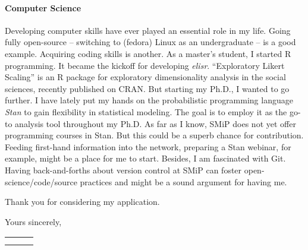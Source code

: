 \documentclass[11pt]{FreemanML}
\begin{document}
\paragraph{Computer Science}

Developing computer skills have ever played an essential role in my life. Going
fully open-source -- switching to (fedora) Linux as an undergraduate -- is a
good example. Acquiring coding skills is another. As a master's student, I
started R programming. It became the kickoff for developing \textit{elisr}.
\enquote{Exploratory Likert Scaling} is an R package for exploratory
dimensionality analysis in the social sciences, recently published on CRAN. But
starting my Ph.D., I wanted to go further. I have lately put my hands on the
probabilistic programming language \textit{Stan} to gain flexibility in
statistical modeling. The goal is to employ it as the go-to analysis tool
throughout my Ph.D. As far as I know, SMiP does not yet offer programming
courses in Stan. But this could be a superb chance for contribution. Feeding
first-hand information into the network, preparing a Stan webinar, for example,
might be a place for me to start. Besides, I am fascinated with Git. Having
back-and-forths about version control at SMiP can foster
open-science/code/source practices and might be a sound argument for having me.

\medskip

Thank you for considering my application.

\medskip

Yours sincerely,

\bigskip
\bigskip


\begin{tabular}{p{8cm}p{.5cm}l}
\dotfill \\ 
\centering{Steven Marcel Bißantz} 
\end{tabular}%
\vfill

\end{document}
